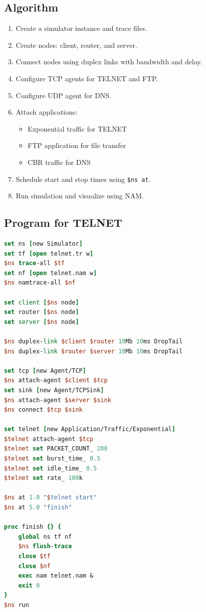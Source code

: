 \documentclass{article}
\begin{document}
\subsection{Algorithm}
\begin{enumerate}
    \item Create a simulator instance and trace files.
    \item Create nodes: client, router, and server.
    \item Connect nodes using duplex links with bandwidth and delay.
    \item Configure TCP agents for TELNET and FTP.
    \item Configure UDP agent for DNS.
    \item Attach applications:
    \begin{itemize}
        \item Exponential traffic for TELNET
        \item FTP application for file transfer
        \item CBR traffic for DNS
    \end{itemize}
    \item Schedule start and stop times using \texttt{\$ns at}.
    \item Run simulation and visualize using NAM.
\end{enumerate}

\subsection{Program for TELNET}
\begin{lstlisting}[language=tcl]
set ns [new Simulator]
set tf [open telnet.tr w]
$ns trace-all $tf
set nf [open telnet.nam w]
$ns namtrace-all $nf

set client [$ns node]
set router [$ns node]
set server [$ns node]

$ns duplex-link $client $router 10Mb 10ms DropTail
$ns duplex-link $router $server 10Mb 10ms DropTail

set tcp [new Agent/TCP]
$ns attach-agent $client $tcp
set sink [new Agent/TCPSink]
$ns attach-agent $server $sink
$ns connect $tcp $sink

set telnet [new Application/Traffic/Exponential]
$telnet attach-agent $tcp
$telnet set PACKET_COUNT_ 200
$telnet set burst_time_ 0.5
$telnet set idle_time_ 0.5
$telnet set rate_ 100k

$ns at 1.0 "$telnet start"
$ns at 5.0 "finish"

proc finish {} {
    global ns tf nf
    $ns flush-trace
    close $tf
    close $nf
    exec nam telnet.nam &
    exit 0
}
$ns run
\end{lstlisting}
\end{document}
